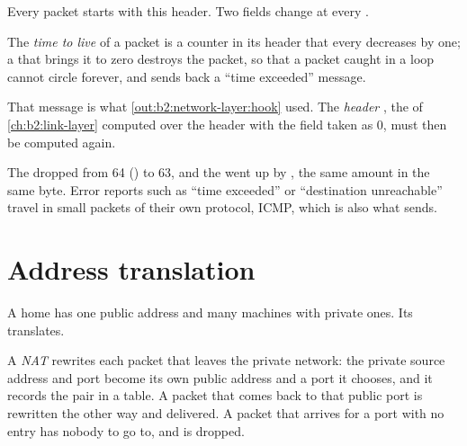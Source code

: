 Every packet starts with this header. Two fields change at every .

\begin{definition}\label{def:b2:network-layer:ttl}
The \emph{time to live} of a packet is a counter in its header that every  decreases by
one; a  that brings it to zero destroys the packet, so that a packet caught in a  loop cannot circle
forever, and sends back a ``time exceeded'' message.
\end{definition}

That message is what \cref{out:b2:network-layer:hook} used. The \emph{header }, the  of \cref{ch:b2:link-layer} computed over the header with the
field taken as 0, must then be computed again.



The  dropped from 64 () to 63, and the  went up by , the same amount in
the same byte. Error reports such as ``time exceeded'' or ``destination unreachable'' travel in small packets of
their own protocol, ICMP, which is also what  sends.

\section{Address translation}\label{sec:b2:network-layer:nat}

A home has one public address and many machines with private ones. Its  translates.

\begin{definition}\label{def:b2:network-layer:nat}
A \emph{NAT}  rewrites each packet that leaves the private network: the
private source address and port become its own public address and a port it chooses, and it records the pair in a
table. A packet that comes back to that public port is rewritten the other way and delivered. A packet that arrives
for a port with no entry has nobody to go to, and is dropped.
\end{definition}

